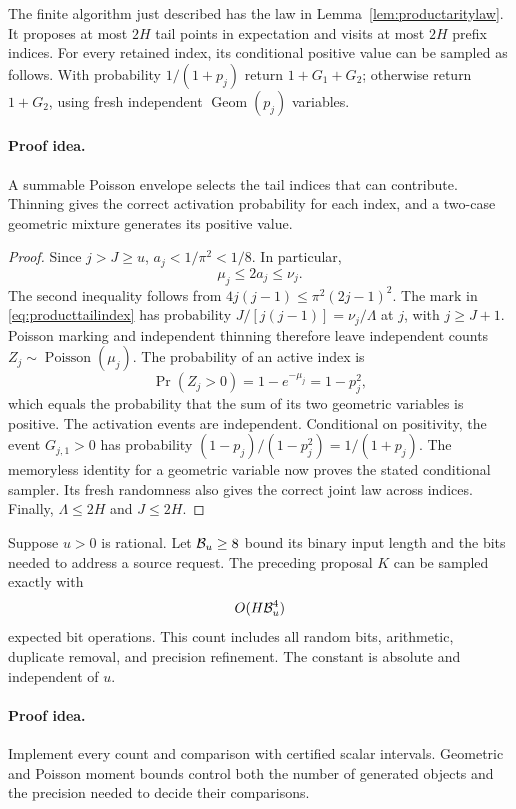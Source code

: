 \begin{lemma}
\label{lem:producttail}
The finite algorithm just described has the law in
Lemma~\ref{lem:productaritylaw}. It proposes at most $2H$ tail
points in expectation and visits at most $2H$ prefix indices.
For every retained index, its conditional positive value can
be sampled as follows. With probability $1/(1+p_j)$ return
$1+G_1+G_2$; otherwise return $1+G_2$, using fresh independent
$\operatorname{Geom}(p_j)$ variables.
\end{lemma}
\paragraph{Proof idea.}
A summable Poisson envelope selects the tail indices that can contribute.
Thinning gives the correct activation probability for each index, and a
two-case geometric mixture generates its positive value.

\begin{proof}
Since $j>J\ge u$,
$a_j<1/\pi^2<1/8$. In particular,
\[
 \mu_j\le2a_j\le\nu_j.
\]
The second inequality follows from
$4j(j-1)\le\pi^2(2j-1)^2$.
The mark in \eqref{eq:producttailindex} has probability
$J/[j(j-1)]=\nu_j/\Lambda$ at $j$, with $j\ge J+1$.
Poisson marking and independent thinning therefore leave
independent counts $Z_j\sim\operatorname{Poisson}(\mu_j)$.
The probability of an active index is
\[
 \Pr(Z_j>0)=1-e^{-\mu_j}=1-p_j^2,
\]
which equals the probability that the sum of its two geometric
variables is positive. The activation events are independent.
Conditional on positivity, the event $G_{j,1}>0$ has probability
$(1-p_j)/(1-p_j^2)=1/(1+p_j)$.
The memoryless identity for a geometric variable now proves
the stated conditional sampler. Its fresh randomness also gives
the correct joint law across indices. Finally,
$\Lambda\le2H$ and $J\le2H$.
\end{proof}

\begin{lemma}
\label{lem:productaritybits}
Suppose $u>0$ is rational. Let $\mathcal B_u\ge8$ bound its binary
input length and the bits needed to address a source request.
The preceding proposal $K$ can be sampled exactly with
\[
 O(H\mathcal B_u^4)
\]
expected bit operations. This count includes all random bits,
arithmetic, duplicate removal, and precision refinement.
The constant is absolute and independent of $u$.
\end{lemma}
\paragraph{Proof idea.}
Implement every count and comparison with certified scalar intervals.
Geometric and Poisson moment bounds control both the number of generated
objects and the precision needed to decide their comparisons.

